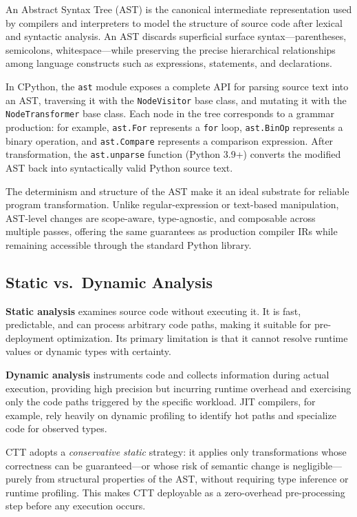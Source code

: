 \documentclass[conference]{IEEEtran}
\begin{document}
An Abstract Syntax Tree (AST) is the canonical intermediate representation
used by compilers and interpreters to model the structure of source code
after lexical and syntactic analysis.  An AST discards superficial surface
syntax---parentheses, semicolons, whitespace---while preserving the precise
hierarchical relationships among language constructs such as expressions,
statements, and declarations.

In CPython, the \texttt{ast} module exposes a complete API for parsing source
text into an AST, traversing it with the \texttt{NodeVisitor} base class, and
mutating it with the \texttt{NodeTransformer} base class.  Each node in the
tree corresponds to a grammar production: for example, \texttt{ast.For}
represents a \texttt{for} loop, \texttt{ast.BinOp} represents a binary
operation, and \texttt{ast.Compare} represents a comparison expression.
After transformation, the \texttt{ast.unparse} function (Python 3.9+)
converts the modified AST back into syntactically valid Python source text.

The determinism and structure of the AST make it an ideal substrate for
reliable program transformation.  Unlike regular-expression or text-based
manipulation, AST-level changes are scope-aware, type-agnostic, and
composable across multiple passes, offering the same guarantees as
production compiler IRs while remaining accessible through the standard
Python library.

\subsection{Static vs.\ Dynamic Analysis}

\textbf{Static analysis} examines source code without executing it.  It is
fast, predictable, and can process arbitrary code paths, making it suitable
for pre-deployment optimization.  Its primary limitation is that it cannot
resolve runtime values or dynamic types with certainty.

\textbf{Dynamic analysis} instruments code and collects information during
actual execution, providing high precision but incurring runtime overhead
and exercising only the code paths triggered by the specific workload.  JIT
compilers, for example, rely heavily on dynamic profiling to identify hot
paths and specialize code for observed types.

CTT adopts a \emph{conservative static} strategy: it applies only
transformations whose correctness can be guaranteed---or whose risk of
semantic change is negligible---purely from structural properties of the AST,
without requiring type inference or runtime profiling.  This makes CTT
deployable as a zero-overhead pre-processing step before any execution occurs.
\end{document}
